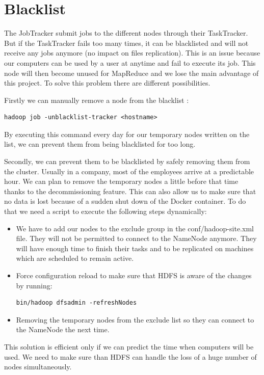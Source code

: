 \documentclass[11pt]{report} %
\begin{document}
\section{Blacklist}

The JobTracker submit jobs to the different nodes through their TaskTracker. But if the TaskTracker fails too many times, it can be blacklisted and will not receive any jobs anymore (no impact on files replication). This is an issue because our computers can be used by a user at anytime and fail to execute its job. This node will then become unused for MapReduce and we lose the main advantage of this project.
To solve this problem there are different possibilities.

Firstly we can manually remove a node from the blacklist : 
\begin{lstlisting}
hadoop job -unblacklist-tracker <hostname>
\end{lstlisting}
By executing this command every day for our temporary nodes written on the list, we can prevent them from being blacklisted for too long.

Secondly, we can prevent them to be blacklisted by safely removing them from the cluster.
Usually in a company, most of the employees arrive at a predictable hour. We can plan to remove the temporary nodes a little before that time thanks to the decommissioning feature.
This can also allow us to make sure that no data is lost because of a sudden shut down of the Docker container. To do that we need a script to execute the following steps dynamically:
\begin{itemize}
\item We have to add our nodes to the exclude group in the conf/hadoop-site.xml file. They will not be permitted to connect to the NameNode anymore. They will have enough time to finish their tasks and to be replicated on machines which are scheduled to remain active.
\item Force configuration reload to make sure that HDFS is aware of the changes by running:
\begin{lstlisting}
bin/hadoop dfsadmin -refreshNodes
\end{lstlisting}
\item Removing the temporary nodes from the exclude list so they can connect to the NameNode the next time.
\end{itemize}

This solution is efficient only if we can predict the time when computers will be used. We need to make sure than HDFS can handle the loss of a huge number of nodes simultaneously.
\end{document}
